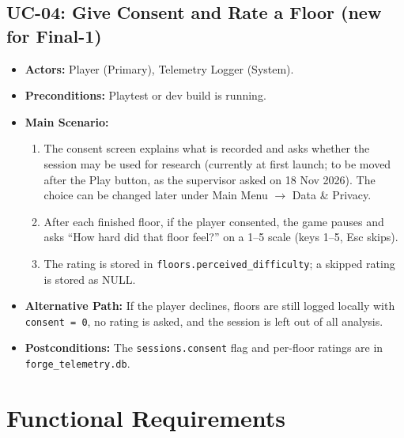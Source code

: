 \subsection{UC-04: Give Consent and Rate a Floor (new for Final-1)}
\begin{itemize}
    \item \textbf{Actors:} Player (Primary), Telemetry Logger (System).
    \item \textbf{Preconditions:} Playtest or dev build is running.
    \item \textbf{Main Scenario:}
    \begin{enumerate}
        \item The consent screen explains what is recorded and asks whether the session may be used for research (currently at first launch; to be moved after the Play button, as the supervisor asked on 18 Nov 2026). The choice can be changed later under Main Menu $\rightarrow$ Data \& Privacy.
        \item After each finished floor, if the player consented, the game pauses and asks ``How hard did that floor feel?'' on a 1--5 scale (keys 1--5, Esc skips).
        \item The rating is stored in \texttt{floors.perceived\_difficulty}; a skipped rating is stored as NULL.
    \end{enumerate}
    \item \textbf{Alternative Path:} If the player declines, floors are still logged locally with \texttt{consent = 0}, no rating is asked, and the session is left out of all analysis.
    \item \textbf{Postconditions:} The \texttt{sessions.consent} flag and per-floor ratings are in \texttt{forge\_telemetry.db}.
\end{itemize}

\section{Functional Requirements}

